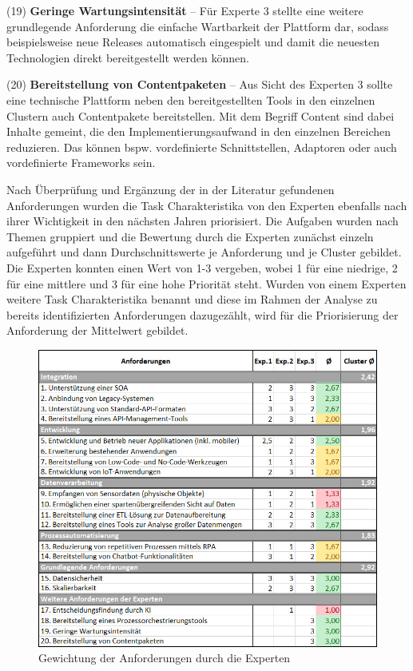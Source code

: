 (19) \textbf{Geringe Wartungsintensität} – Für Experte 3 stellte eine weitere grundlegende Anforderung die einfache Wartbarkeit der Plattform dar, sodass beispielsweise neue Releases automatisch eingespielt und damit die neuesten Technologien direkt bereitgestellt werden können. \autocite[Vgl.][]{SCHMIDT2023} 

(20) \textbf{Bereitstellung von Contentpaketen} – Aus Sicht des Experten 3 sollte eine technische Plattform neben den bereitgestellten Tools in den einzelnen Clustern auch Contentpakete bereitstellen. Mit dem Begriff Content sind dabei Inhalte gemeint, die den Implementierungsaufwand in den einzelnen Bereichen reduzieren. Das können bspw. vordefinierte Schnittstellen, Adaptoren oder auch vordefinierte Frameworks sein. \autocite[Vgl.][]{SCHMIDT2023} 

Nach Überprüfung und Ergänzung der in der Literatur gefundenen Anforderungen wurden die Task Charakteristika von den Experten ebenfalls nach ihrer Wichtigkeit in den nächsten Jahren priorisiert. Die Aufgaben wurden nach Themen gruppiert und die Bewertung durch die Experten zunächst einzeln aufgeführt und dann Durchschnittswerte je Anforderung und je Cluster gebildet. Die Experten konnten einen Wert von 1-3 vergeben, wobei 1 für eine niedrige, 2 für eine mittlere und 3 für eine hohe Priorität steht. Wurden von einem Experten weitere Task Charakteristika benannt und diese im Rahmen der Analyse zu bereits identifizierten Anforderungen dazugezählt, wird für die Priorisierung der Anforderung der Mittelwert gebildet.

\begin{figure}[h]
    \centering
    \includegraphics[width=1\textwidth]{img/Gewichtung_Anforderung2.jpg}
    \caption[Gewichtung der Anforderungen durch die Experten]{Gewichtung der Anforderungen durch die Experten\autocite{Gewichtung}}
    \label{fig:Gewichtung}
\end{figure}

